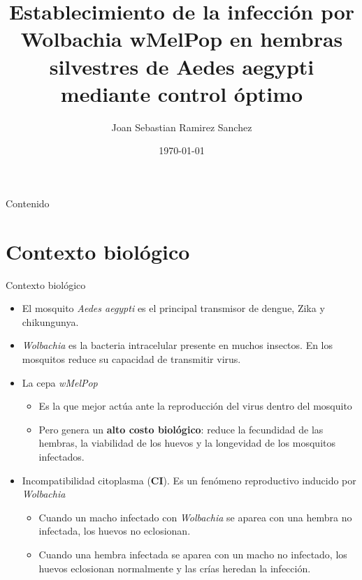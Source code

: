 \documentclass[aspectratio=169]{beamer}
\title{Establecimiento de la infección por Wolbachia wMelPop en hembras silvestres de Aedes aegypti mediante control óptimo}
\author{Joan Sebastian Ramirez Sanchez}
\institute{Universidad del Valle}
\date{\today}
\newcommand{\tb}[1]{\textbf{#1}}
\newcommand{\ti}[1]{\textit{#1}}
\begin{document}
\begin{frame}
    \titlepage%
\end{frame}

\begin{frame}{Contenido}
    \tableofcontents
\end{frame}

\section{Contexto biológico}

\begin{frame}{Contexto biológico}
\begin{itemize}
    \item El mosquito \ti{Aedes aegypti} es el principal transmisor de dengue, Zika y chikungunya.
    \item \ti{Wolbachia} es la bacteria intracelular presente en muchos insectos. En los mosquitos reduce su capacidad de transmitir virus.
    \item La cepa \ti{wMelPop}
    \begin{itemize}
        \item[--] Es la que mejor actúa ante la reproducción del virus dentro del mosquito
        \item[--]Pero genera un \tb{alto costo biológico}: reduce la fecundidad de las hembras, la viabilidad de los huevos y la longevidad de los mosquitos infectados.
    \end{itemize}
    \item  Incompatibilidad citoplasma (\tb{CI}).
    Es un fenómeno reproductivo inducido por \ti{Wolbachia}
    \begin{itemize}
        \item[--] Cuando un macho infectado con \ti{Wolbachia} se aparea con una hembra no infectada, los huevos no eclosionan.
        \item[--] Cuando una hembra infectada se aparea con un macho no infectado, los huevos eclosionan normalmente y las crías heredan la infección.
    \end{itemize}
\end{itemize}

\end{frame}
\end{document}
